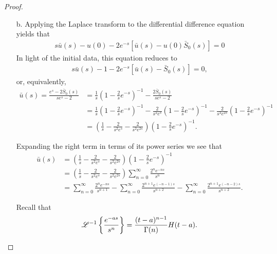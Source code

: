 \begin{proof}
\begin{enumerate}
    \item[b.] Applying the Laplace transform to the differential difference equation yields
      that
      \begin{align*}
        s\bar{u}(s) - u(0) - 2e^{-s}\left[\bar{u}(s) - u(0)\bar{S}_0(s)\right] = 0
      \end{align*}
      In light of the initial data, this equation reduces to
      \begin{align*}
        s\bar{u}(s) - 1 - 2e^{-s}\left[\bar{u}(s) - \bar{S}_0(s)\right] = 0,
      \end{align*}
      or, equivalently,
      \begin{align*}
        \bar{u}(s) = \frac{e^s-2\bar{S}_0(s)}{se^{s}-2}
        &= \frac{1}{s}\left(1-\frac{2}{s}e^{-s}\right)^{-1} - \frac{2\bar{S}_0(s)}{se^{s}-2} \\
        &= \frac{1}{s}\left(1-\frac{2}{s}e^{-s}\right)^{-1} - \frac{2}{s^2e^s}\left(1-\frac{2}{s}e^{-s}\right)^{-1} - \frac{2}{s^2e^{2s}}\left(1-\frac{2}{s}e^{-s}\right)^{-1} \\
        &= \left(\frac{1}{s} - \frac{2}{s^2e^s} - \frac{2}{s^2e^{2s}}\right)\left(1-\frac{2}{s}e^{-s}\right)^{-1}.
      \end{align*}

      Expanding the right term in terms of its power series we see that
      \begin{align*}
        \bar{u}(s)
        &= \left(\frac{1}{s} - \frac{2}{s^2e^s} - \frac{2}{s^2e^{2s}}\right)\left(1-\frac{2}{s}e^{-s}\right)^{-1} \\
        &= \left(\frac{1}{s} - \frac{2}{s^2e^s} - \frac{2}{s^2e^{2s}}\right) \sum_{n=0}^\infty \frac{2^ne^{-ns}}{s^n}\\
        &=\sum_{n=0}^\infty \frac{2^ne^{-ns}}{s^{n+1}} - \sum_{n=0}^\infty \frac{2^{n+1}e^{(-n-1)s}}{s^{n+2}} - \sum_{n=0}^\infty \frac{2^{n+1}e^{(-n-2)s}}{s^{n+2}}.
      \end{align*}

      Recall that
      \begin{align*}
        \mathscr{L}^{-1}\left\{ {\frac{e^{-as}}{s^n}} \right\} = \frac{(t-a)^{n-1}}{\Gamma(n)}H(t-a).
      \end{align*}


\end{enumerate}
\end{proof}
